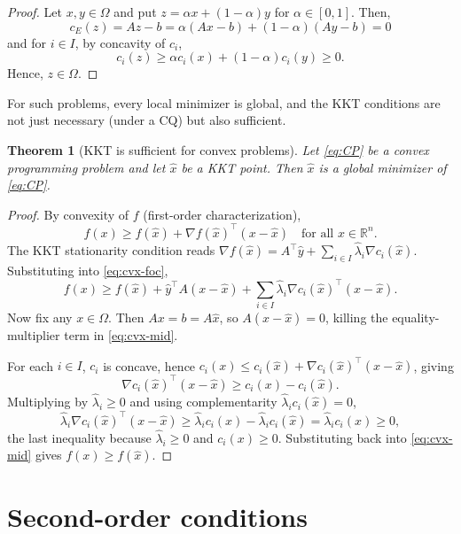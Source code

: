 \documentclass[11pt,a4paper]{report}
\theoremstyle{plain}
\newtheorem{theorem}{Theorem}[chapter]
\theoremstyle{definition}
\newcommand{\R}{\mathbb{R}}
\newcommand{\grad}{\nabla}
\newcommand{\trans}{^{\top}}
\begin{document}
\begin{proof}
  Let $x, y \in \Omega$ and put $z = \alpha x + (1 - \alpha)y$ for $\alpha \in [0, 1]$. Then,
  \[
    c_E(z) = Az - b = \alpha (Ax - b) + (1 - \alpha)(Ay - b) = 0
  \]
  and for $i \in I$, by concavity of $c_i$,
  \[
    c_i(z) \geq \alpha c_i(x) + (1 - \alpha)c_i(y) \geq 0.
  \]
  Hence, $z \in \Omega$.
\end{proof}

For such problems,
every local minimizer is global, and the KKT conditions are not just necessary
(under a CQ) but also sufficient.

\begin{theorem}[KKT is sufficient for convex problems]\label{thm:CP-convex}
Let \eqref{eq:CP} be a convex programming problem and let $\hat{x}$ be a KKT
point. Then $\hat{x}$ is a global minimizer of \eqref{eq:CP}.
\end{theorem}
\begin{proof}
By convexity of $f$ (first-order characterization),
\begin{equation}\label{eq:cvx-foc}
f(x)\ge f(\hat{x})+\grad f(\hat{x})\trans(x-\hat{x})\quad\text{for all }x\in\R^{n}.
\end{equation}
The KKT stationarity condition reads
$\grad f(\hat{x})=A\trans\hat{y}+\sum_{i\in I}\hat{\lambda}_{i}\grad c_{i}(\hat{x})$.
Substituting into \eqref{eq:cvx-foc},
\begin{equation}\label{eq:cvx-mid}
f(x)\ge f(\hat{x})+\hat{y}\trans A(x-\hat{x})+
\sum_{i\in I}\hat{\lambda}_{i}\grad c_{i}(\hat{x})\trans(x-\hat{x}).
\end{equation}
Now fix any $x\in\Omega$. Then $Ax=b=A\hat{x}$, so
$A(x-\hat{x})=0$, killing the equality-multiplier term in
\eqref{eq:cvx-mid}.

For each $i\in I$, $c_{i}$ is concave, hence
$c_{i}(x)\le c_{i}(\hat{x})+\grad c_{i}(\hat{x})\trans(x-\hat{x})$, giving
\[
\grad c_{i}(\hat{x})\trans(x-\hat{x})\ge c_{i}(x)-c_{i}(\hat{x}).
\]
Multiplying by $\hat{\lambda}_{i}\ge 0$ and using complementarity
$\hat{\lambda}_{i}c_{i}(\hat{x})=0$,
\[
\hat{\lambda}_{i}\grad c_{i}(\hat{x})\trans(x-\hat{x})
\ge \hat{\lambda}_{i}c_{i}(x)-\hat{\lambda}_{i}c_{i}(\hat{x})
=\hat{\lambda}_{i}c_{i}(x)\ge 0,
\]
the last inequality because $\hat{\lambda}_{i}\ge 0$ and $c_{i}(x)\ge 0$.
Substituting back into \eqref{eq:cvx-mid} gives $f(x)\ge f(\hat{x})$.
\end{proof}

\section{Second-order conditions}
\end{document}
